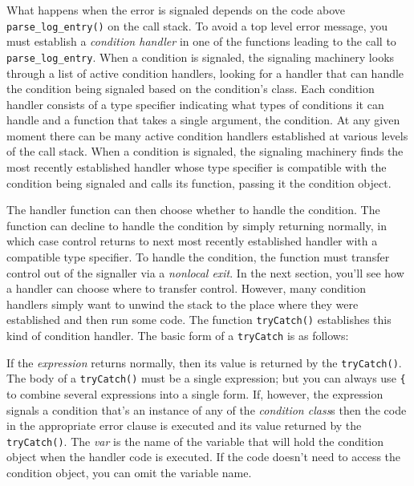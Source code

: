 What happens when the error is signaled depends on the code above
\texttt{parse\_log\_entry()} on the call stack. To avoid a top level
error message, you must establish a \emph{condition handler} in one of
the functions leading to the call to \texttt{parse\_log\_entry}. When a
condition is signaled, the signaling machinery looks through a list of
active condition handlers, looking for a handler that can handle the
condition being signaled based on the condition's class. Each condition
handler consists of a type specifier indicating what types of conditions
it can handle and a function that takes a single argument, the
condition. At any given moment there can be many active condition
handlers established at various levels of the call stack. When a
condition is signaled, the signaling machinery finds the most recently
established handler whose type specifier is compatible with the
condition being signaled and calls its function, passing it the
condition object.

The handler function can then choose whether to handle the condition.
The function can decline to handle the condition by simply returning
normally, in which case control returns to next most recently
established handler with a compatible type specifier. To handle the
condition, the function must transfer control out of the signaller via a
\emph{nonlocal exit}. In the next section, you'll see how a handler can
choose where to transfer control. However, many condition handlers
simply want to unwind the stack to the place where they were established
and then run some code. The function \texttt{tryCatch()} establishes
this kind of condition handler. The basic form of a \texttt{tryCatch} is
as follows:

\begin{Shaded}
\begin{Highlighting}[]
   
   
\NormalTok{)}
\end{Highlighting}
\end{Shaded}

If the \emph{expression} returns normally, then its value is returned by
the \texttt{tryCatch()}. The body of a \texttt{tryCatch()} must be a
single expression; but you can always use \texttt{\{} to combine several
expressions into a single form. If, however, the expression signals a
condition that's an instance of any of the \emph{condition class}s then
the code in the appropriate error clause is executed and its value
returned by the \texttt{tryCatch()}. The \emph{var} is the name of the
variable that will hold the condition object when the handler code is
executed. If the code doesn't need to access the condition object, you
can omit the variable name.


